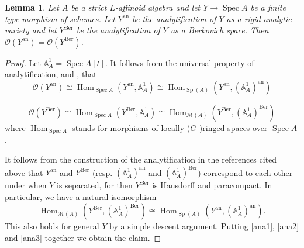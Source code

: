 \documentclass{amsart}
\newtheorem{lem}[prop]{Lemma}
\theoremstyle{definition}
\theoremstyle{remark}
\DeclareMathOperator{\Hom}{Hom}
\DeclareMathOperator{\Spec}{Spec}
\DeclareMathOperator{\Sp}{Sp}
\newcommand{\MM}{\mathscr M}
\newcommand{\OO}{\mathcal O}
\newcommand{\ana}{\mathrm{an}}
\newcommand{\Ber}{\mathrm{Ber}}
\begin{document}
\begin{lem}\label{ana_Ber} Let $A$ be a strict $L$-affinoid algebra
and let $Y \rightarrow \Spec A$ be a finite type morphism of schemes.
Let $Y^{\ana}$ be the analytification of $Y$ as a rigid analytic
variety and let $Y^{\Ber}$ be the analytification of $Y$ as
a Berkovich space. Then $\OO(Y^{\ana})=\OO(Y^{\Ber})$.
\end{lem}
\begin{proof} Let $\mathbb A^1_A=\Spec A[t]$. It follows 
from the universal property of analytification, \cite[Theorem 2.2.5 (1)]{conrad_ample} and \cite[Proposition 2.6.1]{berkovich_ihes}, 
that 
\begin{equation}\label{ana1}
\OO(Y^{\ana}) \cong \Hom_{\Spec A}(Y^{\ana}, \mathbb A^1_A)\cong \Hom_{\Sp(A)}(Y^{\ana}, (\mathbb A^1_A)^{\ana})
\end{equation}

\begin{equation}\label{ana2}
\OO(Y^{\Ber}) \cong \Hom_{\Spec A}(Y^{\Ber}, \mathbb A^1_A)\cong \Hom_{\MM(A)}(Y^{\Ber}, (\mathbb A^1_A)^{\Ber})
\end{equation}
where $\Hom_{\Spec A}$ stands for morphisms of locally ($G$-)ringed  spaces over $\Spec A$.

It follows from the construction of the 
analytification in the references cited above that $Y^{\ana}$ and $Y^{\Ber}$  (resp. 
$(\mathbb A^1_A)^{\ana}$ and $(\mathbb A^1_A)^{\Ber}$) correspond to each other under 
\cite[Theorem 1.6.1]{berkovich_ihes} when $Y$ is separated, for then $Y^{\Ber}$ is Hausdorff and paracompact. In particular,
we have a natural isomorphism 
\begin{equation}\label{ana3}
\Hom_{\MM(A)}(Y^{\Ber}, (\mathbb A^1_A)^{\Ber})\cong 
\Hom_{\Sp(A)}(Y^{\ana}, (\mathbb A^1_A)^{\ana}).
\end{equation}
This also holds for general $Y$ by a simple descent argument.
Putting \eqref{ana1}, \eqref{ana2} and \eqref{ana3} together we obtain the claim. 
\end{proof}
\end{document}
